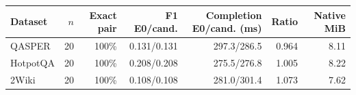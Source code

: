 \begin{tabular}{lrrrrrr}
\toprule
Dataset & $n$ & Exact pair & F1 E0/cand. & Completion E0/cand. (ms) & Ratio & Native MiB \\
\midrule
QASPER & 20 & 100\% & 0.131/0.131 & 297.3/286.5 & 0.964 & 8.11 \\
HotpotQA & 20 & 100\% & 0.208/0.208 & 275.5/276.8 & 1.005 & 8.22 \\
2Wiki & 20 & 100\% & 0.108/0.108 & 281.0/301.4 & 1.073 & 7.62 \\
\bottomrule
\end{tabular}
